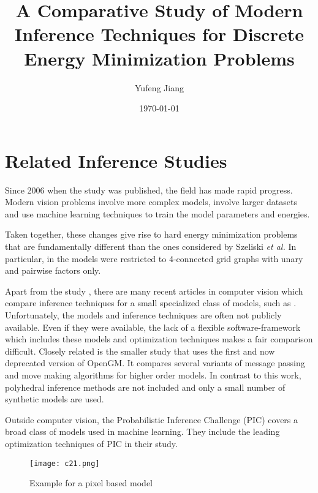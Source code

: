 \documentclass[10pt,twocolumn,letterpaper]{article}
\begin{document}
\title{A Comparative Study of Modern Inference Techniques for Discrete Energy Minimization Problems}
\author{Yufeng Jiang}
\date{\today}
\maketitle
\balance

\section{Related Inference Studies}

Since 2006 when the study was published, the field has made rapid progress. Modern vision problems involve more complex models, involve larger datasets and use machine learning techniques to train the model parameters and energies.

Taken together, these changes give rise to hard energy minimization problems that are fundamentally different than the ones considered by Szeliski \emph{et al.} In particular, in \cite{comparative} the models were restricted to 4-connected grid graphs with unary and pairwise factors only.

Apart from the study \cite{comparative}, there are many recent articles in computer vision which compare inference techniques for a small specialized class of models, such as \cite{Dynamic,Beyond,Comparison}. Unfortunately, the models and inference techniques are often not publicly available. Even if they were available, the lack of a flexible software-framework which includes these models and optimization techniques makes a fair comparison difficult. Closely related is the smaller study that uses the first and now deprecated version of OpenGM. It compares several variants of message passing and move making algorithms for higher order models. In contrast to this work, polyhedral inference methods are not included and only a small number of synthetic models are used.

Outside computer vision, the Probabilistic Inference Challenge (PIC) \cite{PIC2011} covers a broad class of models used in machine learning. They include the leading optimization techniques of PIC in their study.



\begin{figure}[htbp]
\begin{center}
\texttt{[image: c21.png]}
\end{center}
\caption{Example for a pixel based model}
\label{fig1}
\end{figure}
\end{document}
